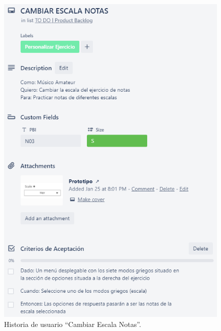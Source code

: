 \documentclass[12pt,twoside,titlepage]{report}
\begin{document}
{\begin{figure}[H]
    \centering
    \includegraphics[scale=1.3]{Scrum/User Stories/NotasSelectorEscalas}
    \caption{Historia de usuario ``Cambiar Escala Notas''.}
    \label{fig:NotasSelectorEscalas}
\end{figure}

}
\end{document}
